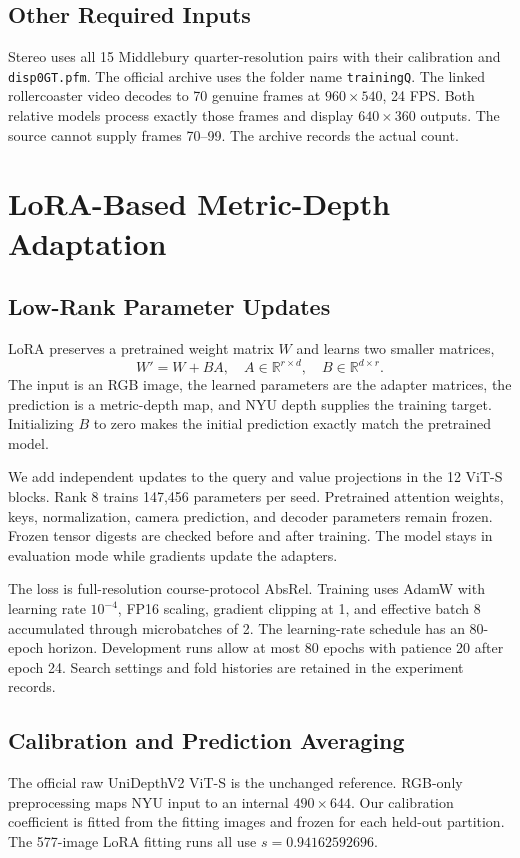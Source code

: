 \documentclass[10pt,twocolumn,letterpaper]{article}
\begin{document}
\subsection{Other Required Inputs}
Stereo uses all 15 Middlebury quarter-resolution pairs with their calibration and \texttt{disp0GT.pfm}. The official archive uses the folder name \texttt{trainingQ}. The linked rollercoaster video decodes to 70 genuine frames at $960\times540$, 24 FPS. Both relative models process exactly those frames and display $640\times360$ outputs. The source cannot supply frames 70--99. The archive records the actual count.

\section{LoRA-Based Metric-Depth Adaptation}
\subsection{Low-Rank Parameter Updates}
LoRA preserves a pretrained weight matrix $W$ and learns two smaller matrices,
\begin{equation}
W'=W+BA, \quad A\in\mathbb{R}^{r\times d},\quad B\in\mathbb{R}^{d\times r}.
\end{equation}
The input is an RGB image, the learned parameters are the adapter matrices, the prediction is a metric-depth map, and NYU depth supplies the training target. Initializing $B$ to zero makes the initial prediction exactly match the pretrained model.

We add independent updates to the query and value projections in the 12 ViT-S blocks. Rank 8 trains 147,456 parameters per seed. Pretrained attention weights, keys, normalization, camera prediction, and decoder parameters remain frozen. Frozen tensor digests are checked before and after training. The model stays in evaluation mode while gradients update the adapters.

The loss is full-resolution course-protocol AbsRel. Training uses AdamW with learning rate $10^{-4}$, FP16 scaling, gradient clipping at 1, and effective batch 8 accumulated through microbatches of 2. The learning-rate schedule has an 80-epoch horizon. Development runs allow at most 80 epochs with patience 20 after epoch 24. Search settings and fold histories are retained in the experiment records.

\subsection{Calibration and Prediction Averaging}
The official raw UniDepthV2 ViT-S is the unchanged reference. RGB-only preprocessing maps NYU input to an internal $490\times644$. Our calibration coefficient is fitted from the fitting images and frozen for each held-out partition. The 577-image LoRA fitting runs all use $s=0.94162592696$.
\end{document}
